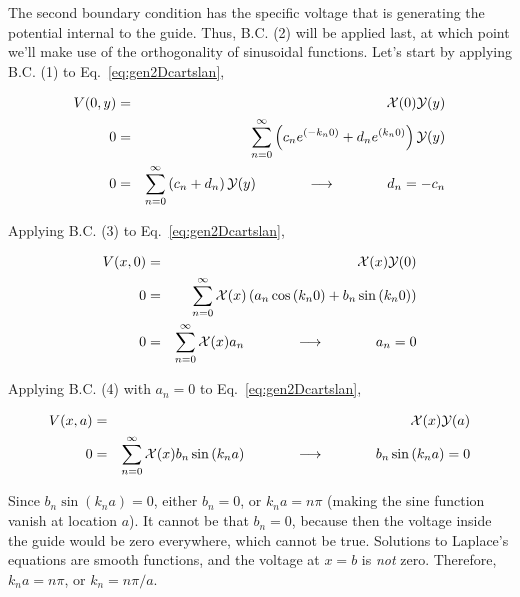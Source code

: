 \documentclass[12pt]{article}
\begin{document}
\begin{flushleft}
The second boundary condition has the specific voltage that is generating the potential internal to the guide.  Thus, B.C. (2) will be applied last, at which point we'll make use of the orthogonality of sinusoidal functions.  Let's start by applying B.C. (1) to Eq.~\ref{eq:gen2Dcartslan},

\begin{eqnarray*}
V(0,y) & = & \mathcal{X}(0)\mathcal{Y}(y) \\
 0 & = & \sum_{n=0}^{\infty} \left( c_{n}e^{(-k_{n}0)} + d_{n}e^{(k_{n}0)} \right)\mathcal{Y}(y) \\
 0 & = & \sum_{n=0}^{\infty} \left( c_{n} + d_{n} \right) \mathcal{Y}(y) \hspace{.5in} \longrightarrow \hspace{.5in} d_{n} = -c_{n} 
\end{eqnarray*}

Applying B.C. (3) to Eq.~\ref{eq:gen2Dcartslan},

\begin{eqnarray*}
V(x,0) & = & \mathcal{X}(x)\mathcal{Y}(0) \\
0 & = & \sum_{n=0}^{\infty} \mathcal{X}(x) \left( a_{n} \cos{(k_{n}0)} + b_{n} \sin{(k_{n}0)} \right) \\
0 & = & \sum_{n=0}^{\infty} \mathcal{X}(x) a_{n} \hspace{.5in} \longrightarrow \hspace{.5in} a_{n} = 0 
\end{eqnarray*}

Applying B.C. (4) with $a_{n}=0$ to Eq.~\ref{eq:gen2Dcartslan},

\begin{eqnarray*}
V(x,a) & = & \mathcal{X}(x)\mathcal{Y}(a) \nonumber \\
0 & = & \sum_{n=0}^{\infty} \mathcal{X}(x) b_{n} \sin{(k_{n}a)} \hspace{.5in} \longrightarrow \hspace{.5in}  b_{n} \sin{(k_{n}a)} = 0
\end{eqnarray*}

Since $b_{n} \sin{(k_{n}a)}=0$, either $b_{n}=0$, or $k_{n}a=n\pi$ (making the sine function vanish at location $a$).  It cannot be that $b_{n}=0$, because then the voltage inside the guide would be zero everywhere, which cannot be true.  Solutions to Laplace's equations are smooth functions, and the voltage at $x=b$ is \textit{not} zero.  Therefore, $k_{n}a=n\pi$, or $k_{n}=n\pi/a$.


\end{flushleft}
\end{document}
